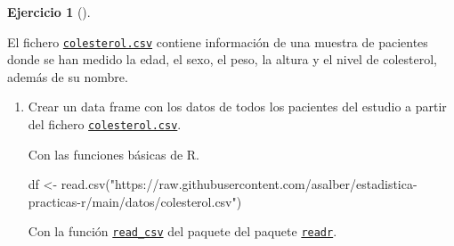 \documentclass[
  a4paper,
]{scrreport}
\newenvironment{Shaded}{\begin{snugshade}}{\end{snugshade}}
\newcommand{\FunctionTok}[1]{\textcolor[rgb]{0.28,0.35,0.67}{#1}}
\newcommand{\NormalTok}[1]{\textcolor[rgb]{0.00,0.23,0.31}{#1}}
\newcommand{\OtherTok}[1]{\textcolor[rgb]{0.00,0.23,0.31}{#1}}
\newcommand{\StringTok}[1]{\textcolor[rgb]{0.13,0.47,0.30}{#1}}
\theoremstyle{definition}
\newtheorem{exercise}{Ejercicio}[chapter]
\theoremstyle{remark}
\begin{document}
\begin{exercise}[]\protect\hypertarget{exr-preprocesamiento-2}{}\label{exr-preprocesamiento-2}

El fichero \href{datos/colesterol.csv}{\texttt{colesterol.csv}} contiene
información de una muestra de pacientes donde se han medido la edad, el
sexo, el peso, la altura y el nivel de colesterol, además de su nombre.

\begin{enumerate}
\def\labelenumi{\alph{enumi}.}
\item
  Crear un data frame con los datos de todos los pacientes del estudio a
  partir del fichero
  \href{datos/colesterol.csv}{\texttt{colesterol.csv}}.

  \begin{tcolorbox}[enhanced jigsaw, toprule=.15mm, rightrule=.15mm, arc=.35mm, colback=white, colbacktitle=quarto-callout-tip-color!10!white, toptitle=1mm, left=2mm, colframe=quarto-callout-tip-color-frame, opacityback=0, breakable, opacitybacktitle=0.6, bottomtitle=1mm, titlerule=0mm, title=\textcolor{quarto-callout-tip-color}{\faLightbulb}\hspace{0.5em}{Solución 1}, bottomrule=.15mm, coltitle=black, leftrule=.75mm]

  Con las funciones básicas de R.

\begin{Shaded}
\begin{Highlighting}[]
\NormalTok{df }\OtherTok{\textless{}{-}} \FunctionTok{read.csv}\NormalTok{(}\StringTok{"https://raw.githubusercontent.com/asalber/estadistica{-}practicas{-}r/main/datos/colesterol.csv"}\NormalTok{)}
\end{Highlighting}
\end{Shaded}

  \end{tcolorbox}

  \begin{tcolorbox}[enhanced jigsaw, toprule=.15mm, rightrule=.15mm, arc=.35mm, colback=white, colbacktitle=quarto-callout-tip-color!10!white, toptitle=1mm, left=2mm, colframe=quarto-callout-tip-color-frame, opacityback=0, breakable, opacitybacktitle=0.6, bottomtitle=1mm, titlerule=0mm, title=\textcolor{quarto-callout-tip-color}{\faLightbulb}\hspace{0.5em}{Solución 2}, bottomrule=.15mm, coltitle=black, leftrule=.75mm]

  Con la función
  \href{https://readr.tidyverse.org/reference/read_delim.html}{\texttt{read\_csv}}
  del paquete del paquete
  \href{https://readr.tidyverse.org/index.html}{\texttt{readr}}.


\end{tcolorbox}
\end{enumerate}
\end{exercise}
\end{document}
